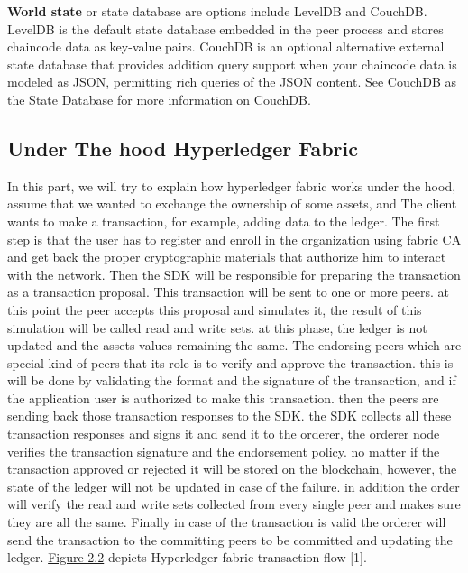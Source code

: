 \textbf{World state} or state database are options include LevelDB and CouchDB. LevelDB is the default state database embedded in the peer process and stores chaincode data as key-value pairs. CouchDB is an optional alternative external state database that provides addition query support when your chaincode data is modeled as JSON, permitting rich queries of the JSON content. See CouchDB as the State Database for more information on CouchDB.


\cleardoublepage

\subsection{Under The hood Hyperledger Fabric }

In this part, we will try to explain how hyperledger fabric works under the hood,
assume that we wanted to exchange the ownership of some assets, and The client wants to make a transaction, for example, adding data to the ledger. 
The first step is that the user has to register and enroll in the organization using fabric CA and get back the proper cryptographic materials that authorize him to interact with the network. Then the SDK will be responsible for preparing the transaction as a transaction proposal. This transaction will be sent to one or more peers. 
at this point the peer accepts this proposal and simulates it, the result of this simulation will be called read and write sets. at this phase, the ledger is not updated and the assets values remaining the same. 
The endorsing peers which are special kind of peers that its role is to verify and approve the transaction. this is will be done by validating the format and the signature of the transaction, and if the application user is authorized to make this transaction. 
then the peers are sending back those transaction responses to the SDK. the SDK collects all these transaction responses and signs it and send it to the orderer, the orderer node verifies the transaction signature and the endorsement policy. no matter if the transaction approved or rejected it will be stored on the blockchain, however, the state of the ledger will not be updated in case of the failure. in addition the order will verify the read and write sets collected from every single peer and makes sure they are all the same. 
Finally in case of the transaction is valid the orderer will send the transaction to the committing peers to be committed and updating the ledger.
\hyperref[fig:transactionflow]{Figure 2.2} depicts Hyperledger fabric transaction flow [1]. 
